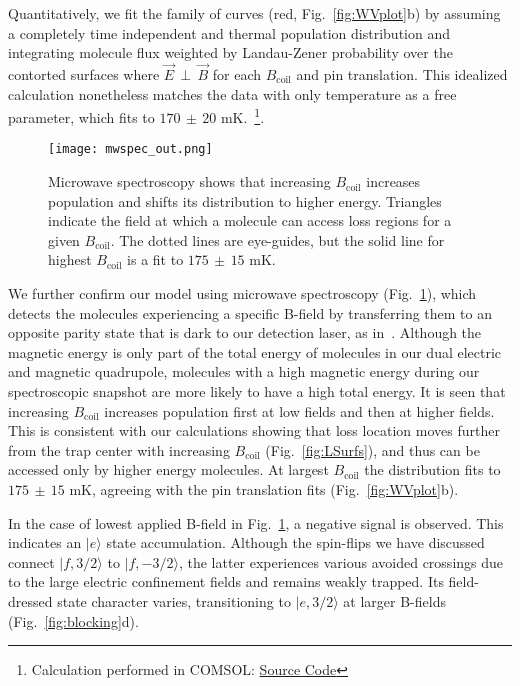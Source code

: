 \documentclass[%
 reprint,
 amsmath,amssymb,
 aps,
prl,
]{revtex4-1}
\newcommand{\bcl}{{$B_\text{coil}$}}
\newcommand{\epb}{{$\vec{E}\,{\perp}\,\vec{B}$}}
\begin{document}
Quantitatively, we fit the family of curves (red, Fig.~\ref{fig:WVplot}b) by assuming a completely time independent and thermal population distribution and integrating molecule flux weighted by Landau-Zener probability over the contorted surfaces where \epb{} for each \bcl{} and pin translation.
This idealized calculation nonetheless matches the data with only temperature as a free parameter, which fits to $170\,{\pm}\,20\text{ mK}$.~\footnote{Calculation performed in COMSOL: \href{https://github.com/dreens/spin-flip-integration/}{Source Code}}.

\begin{figure}[tb]
\texttt{[image: mwspec\_out.png]}%
\caption{
Microwave spectroscopy shows that increasing \bcl{} increases population and shifts its distribution to higher energy. 
Triangles indicate the field at which a molecule can access loss regions for a given \bcl. 
The dotted lines are eye-guides, but the solid line for highest \bcl{} is a fit to $175\,{\pm}\,15\text{ mK}$.
\label{fig:spec}}
\end{figure}

We further confirm our model using microwave spectroscopy (Fig.~\ref{fig:spec}), which detects the molecules experiencing a specific B-field by transferring them to an opposite parity state that is dark to our detection laser, as in~\cite{Stuhl2012evap}.
Although the magnetic energy is only part of the total energy of molecules in our dual electric and magnetic quadrupole, molecules with a high magnetic energy during our spectroscopic snapshot are more likely to have a high total energy. 
It is seen that increasing \bcl{} increases population first at low fields and then at higher fields. 
This is consistent with our calculations showing that loss location moves further from the trap center with increasing \bcl{} (Fig.~\ref{fig:LSurfs}), and thus can be accessed only by higher energy molecules. 
At largest \bcl{} the distribution fits to $175\,{\pm}\,15\text{ mK}$, agreeing with the pin translation fits (Fig.~\ref{fig:WVplot}b).

In the case of lowest applied B-field in Fig.~\ref{fig:spec}, a negative signal is observed. 
This indicates an $|e\rangle$ state accumulation. 
Although the spin-flips we have discussed connect $|f,3/2\rangle$ to $|f,-3/2\rangle$, the latter experiences various avoided crossings due to the large electric confinement fields and remains weakly trapped.  
Its field-dressed state character varies, transitioning to $|e,3/2\rangle$ at larger B-fields (Fig.~\ref{fig:blocking}d). 
\end{document}
